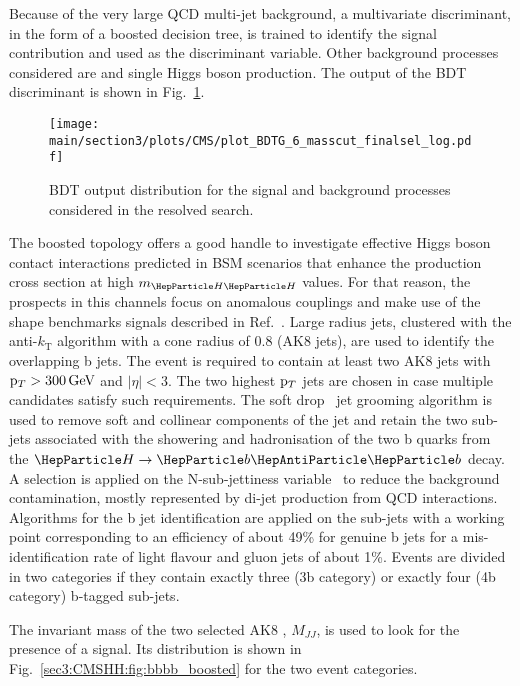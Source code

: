 Because of the very large QCD multi-jet background, a multivariate discriminant, in the form of a boosted decision tree, is trained to identify the \HH signal contribution and used as the discriminant variable.
Other background processes considered are \ttbar and single Higgs boson production.
The output of the BDT discriminant is shown in Fig.~\ref{sec3:CMSHH:fig:bbbb_BDT}.

\begin{figure}[!htb]
\centering 
\texttt{[image: \\main/section3/plots/CMS/plot\_BDTG\_6\_masscut\_finalsel\_log.pdf]}
\caption{BDT output distribution for the signal and background processes considered in the \bbbb resolved search.} 
\label{sec3:CMSHH:fig:bbbb_BDT} 
\end{figure}

The boosted topology offers a good handle to investigate effective Higgs boson contact interactions predicted in BSM scenarios that enhance the \HH production cross section at high $m_{\HH}$ values.
For that reason, the prospects in this channels focus on anomalous couplings and make use of the shape benchmarks signals described in Ref.~\cite{Carvalho2016}.
Large radius jets, clustered with the anti-$k_\text{T}$ algorithm with a cone radius of 0.8 (AK8 jets), are used to identify the  overlapping b jets.
The event is required to contain at least two AK8 jets with $\mathrm{p}_{T} > 300\,\text{Ge\hspace{-.08em}V}$ and $|\eta| < 3$.
The two highest $\mathrm{p}_{T}$ jets are chosen in case multiple candidates satisfy such requirements.
The soft drop~\cite{Dasgupta:2013ihk,Larkoski:2014wba} jet grooming algorithm is used to remove soft and collinear components of the jet and retain the two sub-jets associated with the showering and hadronisation of the two b quarks from the $\PH\to\PQb\PAQb$ decay.
A selection is applied on the N-sub-jettiness variable~\cite{Thaler:2011gf} to reduce the background contamination, mostly represented by di-jet production from QCD interactions.
Algorithms for the b jet identification are applied on the sub-jets with a working point corresponding to an efficiency of about 49\% for genuine b jets for a mis-identification rate of light flavour and gluon jets of about 1\%.
Events are divided in two categories if they contain exactly three (3b category) or exactly four (4b category) b-tagged sub-jets.

The invariant mass of the two selected AK8 , $M_{JJ}$, is used to look for the presence of a signal. Its distribution is shown in Fig.~\ref{sec3:CMSHH:fig:bbbb_boosted} for the two event categories.

